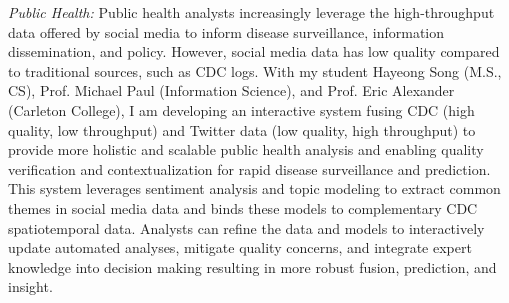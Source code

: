 \documentclass[11pt]{article}
\begin{document}
\emph{Public Health:} Public health analysts increasingly leverage the high-throughput data offered by social media to inform disease surveillance, information dissemination, and policy. However, social media data has low quality compared to traditional sources, such as CDC logs. With my student Hayeong Song (M.S., CS), Prof. Michael Paul (Information Science), and Prof. Eric Alexander (Carleton College), I am developing an interactive system fusing CDC (high quality, low throughput) and Twitter data (low quality, high throughput) to provide more holistic and scalable public health analysis and enabling quality verification and contextualization for rapid disease surveillance and prediction. %
This system leverages sentiment analysis and topic modeling to extract common themes in social media data and binds these models to complementary CDC spatiotemporal data. Analysts can refine the data and models to interactively update automated analyses, mitigate quality concerns, and integrate expert knowledge into decision making resulting in more robust fusion, prediction, and insight. 
\end{document}
